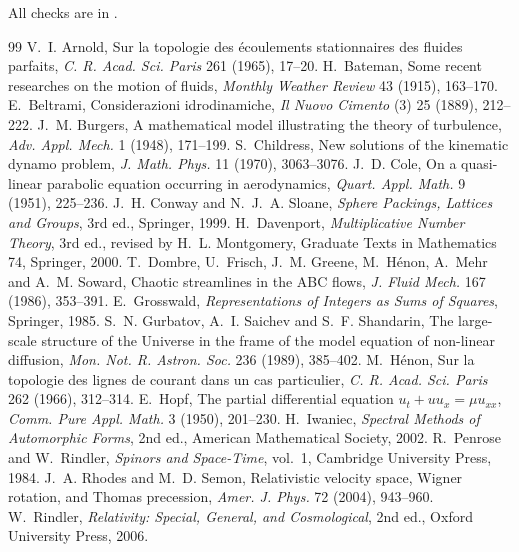 \documentclass[11pt]{article}
\begin{document}
\begin{sloppypar}\noindent
All checks are in .
\end{sloppypar}

\begin{thebibliography}{99}\small
{} V.~I. Arnold, Sur la topologie des \'ecoulements stationnaires des fluides parfaits, \emph{C. R. Acad. Sci. Paris} 261 (1965), 17--20.
 H.~Bateman, Some recent researches on the motion of fluids, \emph{Monthly Weather Review} 43 (1915), 163--170.
 E.~Beltrami, Considerazioni idrodinamiche, \emph{Il Nuovo Cimento} (3) 25 (1889), 212--222.
 J.~M. Burgers, A mathematical model illustrating the theory of turbulence, \emph{Adv. Appl. Mech.} 1 (1948), 171--199.
 S.~Childress, New solutions of the kinematic dynamo problem, \emph{J. Math. Phys.} 11 (1970), 3063--3076.
 J.~D. Cole, On a quasi-linear parabolic equation occurring in aerodynamics, \emph{Quart. Appl. Math.} 9 (1951), 225--236.
 J.~H. Conway and N.~J.~A. Sloane, \emph{Sphere Packings, Lattices and Groups}, 3rd ed., Springer, 1999.
 H.~Davenport, \emph{Multiplicative Number Theory}, 3rd ed., revised by H.~L. Montgomery, Graduate Texts in Mathematics 74, Springer, 2000.
 T.~Dombre, U.~Frisch, J.~M. Greene, M.~H\'enon, A.~Mehr and A.~M. Soward, Chaotic streamlines in the ABC flows, \emph{J. Fluid Mech.} 167 (1986), 353--391.
 E.~Grosswald, \emph{Representations of Integers as Sums of Squares}, Springer, 1985.
 S.~N. Gurbatov, A.~I. Saichev and S.~F. Shandarin, The large-scale structure of the Universe in the frame of the model equation of non-linear diffusion, \emph{Mon. Not. R. Astron. Soc.} 236 (1989), 385--402.
 M.~H\'enon, Sur la topologie des lignes de courant dans un cas particulier, \emph{C. R. Acad. Sci. Paris} 262 (1966), 312--314.
 E.~Hopf, The partial differential equation $u_t+uu_x = \mu u_{xx}$, \emph{Comm. Pure Appl. Math.} 3 (1950), 201--230.
 H.~Iwaniec, \emph{Spectral Methods of Automorphic Forms}, 2nd ed., American Mathematical Society, 2002.
 R.~Penrose and W.~Rindler, \emph{Spinors and Space-Time}, vol.~1, Cambridge University Press, 1984.
 J.~A. Rhodes and M.~D. Semon, Relativistic velocity space, Wigner rotation, and Thomas precession, \emph{Amer. J. Phys.} 72 (2004), 943--960.
 W.~Rindler, \emph{Relativity: Special, General, and Cosmological}, 2nd ed., Oxford University Press, 2006.

\end{thebibliography}
\end{document}

